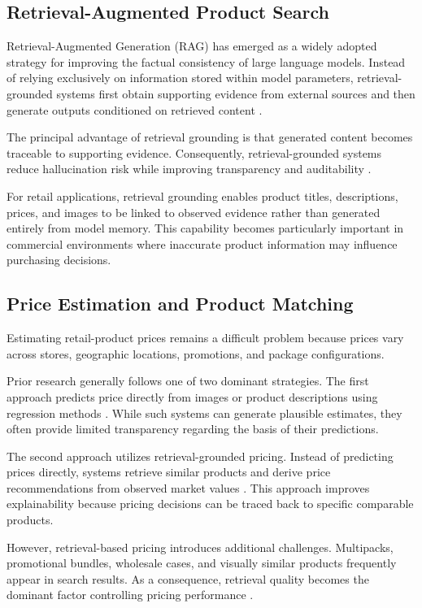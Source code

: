 \documentclass[conference]{IEEEtran}
\begin{document}
\subsection{Retrieval-Augmented Product Search}

Retrieval-Augmented Generation (RAG) has emerged as a widely adopted
strategy for improving the factual consistency of large language models.
Instead of relying exclusively on information stored within model
parameters, retrieval-grounded systems first obtain supporting evidence
from external sources and then generate outputs conditioned on retrieved
content \cite{li2024modict}.

The principal advantage of retrieval grounding is that generated content
becomes traceable to supporting evidence. Consequently, retrieval-grounded
systems reduce hallucination risk while improving transparency and
auditability \cite{li2024modict}.

For retail applications, retrieval grounding enables product titles,
descriptions, prices, and images to be linked to observed evidence rather
than generated entirely from model memory. This capability becomes
particularly important in commercial environments where inaccurate product
information may influence purchasing decisions.

\subsection{Price Estimation and Product Matching}

Estimating retail-product prices remains a difficult problem because prices
vary across stores, geographic locations, promotions, and package
configurations.

Prior research generally follows one of two dominant strategies. The first
approach predicts price directly from images or product descriptions using
regression methods \cite{chen2018price}. While such systems can generate
plausible estimates, they often provide limited transparency regarding the
basis of their predictions.

The second approach utilizes retrieval-grounded pricing. Instead of
predicting prices directly, systems retrieve similar products and derive
price recommendations from observed market values \cite{llp2025}. This
approach improves explainability because pricing decisions can be traced
back to specific comparable products.

However, retrieval-based pricing introduces additional challenges.
Multipacks, promotional bundles, wholesale cases, and visually similar
products frequently appear in search results. As a consequence, retrieval
quality becomes the dominant factor controlling pricing performance
\cite{llp2025}.
\end{document}
